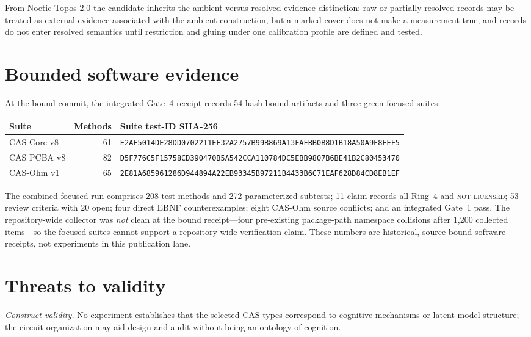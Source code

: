 \documentclass[11pt]{amsart}
\theoremstyle{definition}
\theoremstyle{remark}
\begin{document}
From Noetic Topos 2.0 the candidate inherits the ambient-versus-resolved evidence distinction: raw or partially resolved records may be treated as external evidence associated with the ambient construction, but a marked cover does not make a measurement true, and records do not enter resolved semantics until restriction and gluing under one calibration profile are defined and tested.

\section{Bounded software evidence}\label{sec:evidence}

At the bound commit, the integrated Gate~4 receipt records 54 hash-bound artifacts and three green focused suites:

\begin{center}
\small
\begin{tabular}{@{}lrl@{}}
\toprule
Suite & Methods & Suite test-ID SHA-256 \\
\midrule
CAS Core v8 & 61 & \texttt{E2AF5014DE28DD0702211EF32A2757B99B869A13FAFBB0B8D1B18A50A9F8FEF5} \\
CAS PCBA v8 & 82 & \texttt{D5F776C5F15758CD390470B5A542CCA110784DC5EBB9807B6BE41B2C80453470} \\
CAS-Ohm v1 & 65 & \texttt{2E81A685961286D944894A22EB93345B97211B4433B6C71EAF628D84CD8EB1EF} \\
\bottomrule
\end{tabular}
\end{center}

The combined focused run comprises 208 test methods and 272 parameterized subtests; 11 claim records all Ring~4 and \textsc{not licensed}; 53 review criteria with 20 open; four direct EBNF counterexamples; eight CAS-Ohm source conflicts; and an integrated Gate~1 pass. The repository-wide collector was \emph{not} clean at the bound receipt---four pre-existing package-path namespace collisions after 1{,}200 collected items---so the focused suites cannot support a repository-wide verification claim. These numbers are historical, source-bound software receipts, not experiments in this publication lane.

\section{Threats to validity}\label{sec:threats}

\emph{Construct validity.} No experiment establishes that the selected CAS types correspond to cognitive mechanisms or latent model structure; the circuit organization may aid design and audit without being an ontology of cognition.
\end{document}
